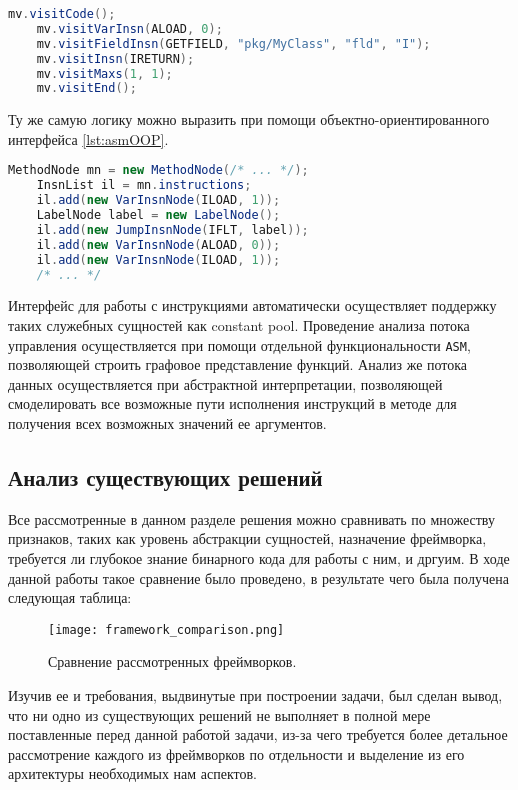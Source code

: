 \begin{lstlisting}[language=Java, caption=Пример использования событийного интерфейса., label=lst:asmVisitor]
    mv.visitCode();
    mv.visitVarInsn(ALOAD, 0);
    mv.visitFieldInsn(GETFIELD, "pkg/MyClass", "fld", "I");
    mv.visitInsn(IRETURN);
    mv.visitMaxs(1, 1);
    mv.visitEnd();
\end{lstlisting}

Ту же самую логику можно выразить при помощи объектно-ориентированного интерфейса \autoref{lst:asmOOP}.

\begin{lstlisting}[language=Java, caption=Пример использования объектно-ориентированного интерфейса., label=lst:asmOOP]
    MethodNode mn = new MethodNode(/* ... */);
    InsnList il = mn.instructions;
    il.add(new VarInsnNode(ILOAD, 1));
    LabelNode label = new LabelNode();
    il.add(new JumpInsnNode(IFLT, label));
    il.add(new VarInsnNode(ALOAD, 0));
    il.add(new VarInsnNode(ILOAD, 1));
    /* ... */
\end{lstlisting}

Интерфейс для работы с инструкциями автоматически осуществляет поддержку таких служебных сущностей как constant pool. Проведение анализа потока управления осуществляется при помощи отдельной функциональности \texttt{ASM}, позволяющей строить графовое представление функций. Анализ же потока данных осуществляется при абстрактной интерпретации, позволяющей смоделировать все возможные пути исполнения инструкций в методе для получения всех возможных значений ее аргументов.

\subsection{Анализ существующих решений}

Все рассмотренные в данном разделе решения можно сравнивать по множеству признаков, таких как уровень абстракции сущностей, назначение фреймворка, требуется ли глубокое знание бинарного кода для работы с ним, и дргуим. В ходе данной работы такое сравнение было проведено, в результате чего была получена следующая таблица:

\begin{figure}[h]
\centering
\texttt{[image: framework\_comparison.png]}
\caption{Сравнение рассмотренных фреймворков.}
\label{fig:kavaArch}
\end{figure}

Изучив ее и требования, выдвинутые при построении задачи, был сделан вывод, что ни одно из существующих решений не выполняет в полной мере поставленные перед данной работой задачи, из-за чего требуется более детальное рассмотрение каждого из фреймворков по отдельности и выделение из его архитектуры необходимых нам аспектов.

\newpage
